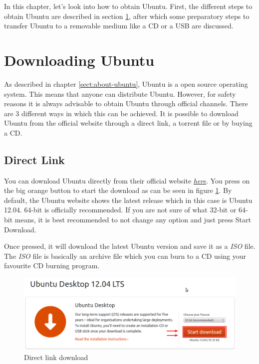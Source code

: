 In this chapter, let's look into how to obtain Ubuntu. First, the different steps to obtain Ubuntu are described in section \ref{sect:obtain_ubuntu}, after which some preparatory steps to transfer Ubuntu to a removable medium like a CD or a USB are discussed.

\section{Downloading Ubuntu} \label{sect:obtain_ubuntu} 
As described in chapter \ref{sect:about-ubuntu}, Ubuntu is a open source operating system. This means that anyone can distribute Ubuntu. However, for safety reasons it is always advisable to obtain Ubuntu through official channels. There are 3 different ways in which this can be achieved. It is possible to download Ubuntu from the official website through a direct link, a torrent file or by buying a CD.

\subsection*{Direct Link} \label{sect:obtain_ubuntu_direct} 
You can download Ubuntu directly from their official website \href{http://www.ubuntu.com/download/ubuntu/download}{\textit{here}}. You press on the big orange button to start the download as can be seen in figure \ref{fig:direct-link}. By default, the Ubuntu website shows the latest release which in this case is Ubuntu 12.04. 64-bit is officially recommended. If you are not sure of what 32-bit or 64-bit means, it is best recommended to not change any option and just press Start Download.\\ 

\par \noindent Once pressed, it will download the latest Ubuntu version and save it as a \emph{ISO} file. The \emph{ISO} file is basically an archive file which you can burn to a CD using your favourite CD burning program. 

\begin{figure}[h]	
	\begin{center}
	\includegraphics[width=400pt]{./images/obtain-ubuntu/direct-link.png}
	\caption{Direct link download}	
	\label{fig:direct-link}	
	\end{center}
\end{figure}


